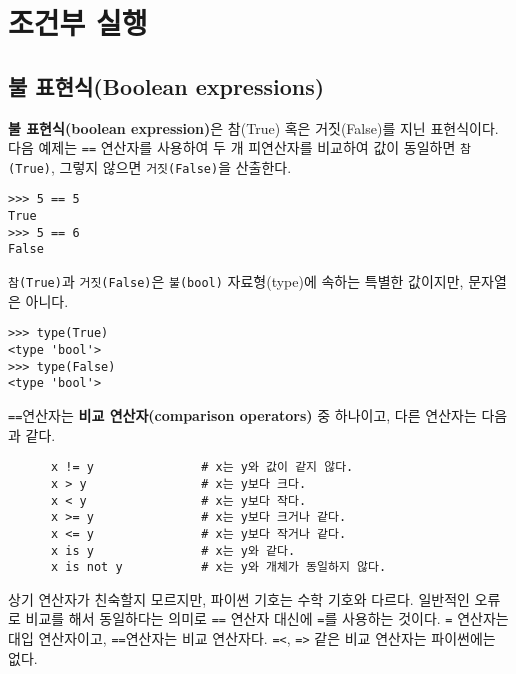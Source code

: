 
\chapter{조건부 실행}

\section{불 표현식(Boolean expressions)}

{\bf 불 표현식(boolean expression)}은 참(True) 혹은 거짓(False)를 지닌 표현식이다. 
다음 예제는 {\tt ==} 연산자를 사용하여 두 개 피연산자를 비교하여 값이 동일하면 {\tt 참(True)}, 그렇지 않으면 {\tt 거짓(False)}을 산출한다.

\beforeverb
\begin{verbatim}
>>> 5 == 5
True
>>> 5 == 6
False
\end{verbatim}
\afterverb
%

{\tt 참(True)}과 {\tt 거짓(False)}은 {\tt 불(bool)} 자료형(type)에 속하는 특별한 값이지만, 문자열은 아니다.


\beforeverb
\begin{verbatim}
>>> type(True)
<type 'bool'>
>>> type(False)
<type 'bool'>
\end{verbatim}
\afterverb
%

{\tt ==}연산자는 {\bf 비교 연산자(comparison operators)} 중 하나이고, 다른 연산자는 다음과 같다.

\beforeverb
\begin{verbatim}
      x != y               # x는 y와 값이 같지 않다.
      x > y                # x는 y보다 크다.
      x < y                # x는 y보다 작다.
      x >= y               # x는 y보다 크거나 같다.
      x <= y               # x는 y보다 작거나 같다.
      x is y               # x는 y와 같다.
      x is not y           # x는 y와 개체가 동일하지 않다.
\end{verbatim}
\afterverb
%
상기 연산자가 친숙할지 모르지만, 파이썬 기호는 수학 기호와 다르다. 
일반적인 오류로 비교를 해서 동일하다는 의미로 {\tt ==} 연산자 대신에 {\tt =}를 사용하는 것이다.
{\tt =} 연산자는 대입 연산자이고, {\tt ==}연산자는 비교 연산자다. 
{\tt =<}, {\tt =>} 같은 비교 연산자는 파이썬에는 없다.

